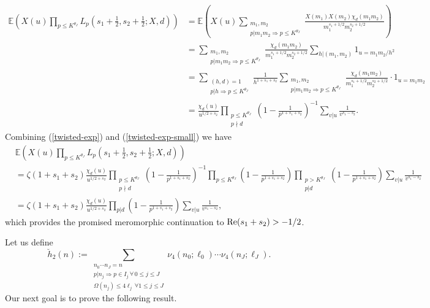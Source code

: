 \documentclass[a4paper,10pt,twoside]{amsart}
\theoremstyle{definition}
\numberwithin{equation}{section}
\renewcommand{\Re}{\textnormal{Re}}
\renewcommand\:{\colon}
\begin{document}
\begin{align}\label{twisted-exp-small}
\mathbb E\left(X(u)\prod_{p\leq K^{\theta_J}}L_p\left(s_1+\frac12,s_2+\frac12;X,d\right)\right)&=\mathbb E\left(X(u)\sum_{\substack{m_1,m_2\\
p|m_1m_2\Rightarrow p\leq K^{\theta_J}}}\frac{X(m_1)X(m_2)\chi_d(m_1m_2)}{m_1^{s_1+1/2}m_2^{s_2+1/2}}\right) \nonumber\\
&=\sum_{\substack{m_1,m_2\\
p|m_1m_2\Rightarrow p\leq K^{\theta_J}}}\frac{\chi_d(m_1m_2)}{m_1^{s_1+1/2}m_2^{s_2+1/2}}\sum_{h|(m_1,m_2)}1_{u=m_1m_2/h^2} \nonumber\\
&=\sum_{\substack{(h,d)=1\\
p|h\Rightarrow p\leq K^{\theta_J}}}\frac1{h^{1+s_1+s_2}}\sum_{\substack{m_1,m_2\\
p|m_1m_2\Rightarrow p\leq K^{\theta_J}}}\frac{\chi_d(m_1m_2)}{m_1^{s_1+1/2}m_2^{s_2+1/2}}\cdot 1_{u=m_1m_2} \nonumber\\
&=\frac{\chi_d(u)}{u^{1/2+s_2}}\prod_{\substack{p\leq K^{\theta_J}\\
p\nmid d}}\left(1-\frac1{p^{1+s_1+s_2}}\right)^{-1}\sum_{v|u}\frac1{v^{s_1-s_2}}.
\end{align}
Combining (\ref{twisted-exp}) and (\ref{twisted-exp-small}) we have 
\begin{align*}
&\mathbb E\left(X(u)\prod_{p\leq K^{\theta_J}}L_p\left(s_1+\frac12,s_2+\frac12;X,d\right)\right)\\
&=\zeta(1+s_1+s_2)\frac{\chi_d(u)}{u^{1/2+s_2}}\prod_{\substack{p\leq K^{\theta_J}\\
p\nmid d}}\left(1-\frac1{p^{1+s_1+s_2}}\right)^{-1}\prod_{p\leq K^{\theta_J}}\left(1-\frac1{p^{1+s_1+s_2}}\right)\prod_{\substack{p>K^{\theta_J}\\
p|d}}\left(1-\frac1{p^{1+s_1+s_2}}\right)\sum_{v|u}\frac1{v^{s_1-s_2}}\\
&=\zeta(1+s_1+s_2)\frac{\chi_d(u)}{u^{1/2+s_2}}\prod_{p|d}\left(1-\frac1{p^{1+s_1+s_2}}\right)\sum_{v|u}\frac1{v^{s_1-s_2}},
\end{align*}
which provides the promised meromorphic continuation to $\Re(s_1+s_2)>-1/2$.

Let us define 
\[ 
\breve h_2(n):=\sum_{\substack{n_0\cdots n_J=n \\
p|n_j\Rightarrow p\in I_j\,\forall\, 0\leq j\leq J\\
\Omega(n_j)\leq 4\ell_j\,\forall 1\leq j\leq J}}\nu_{4}(n_0;\ell_0)\cdots\nu_{4}(n_J;\ell_J).
\]
Our next goal is to prove the following result. 
\end{document}
